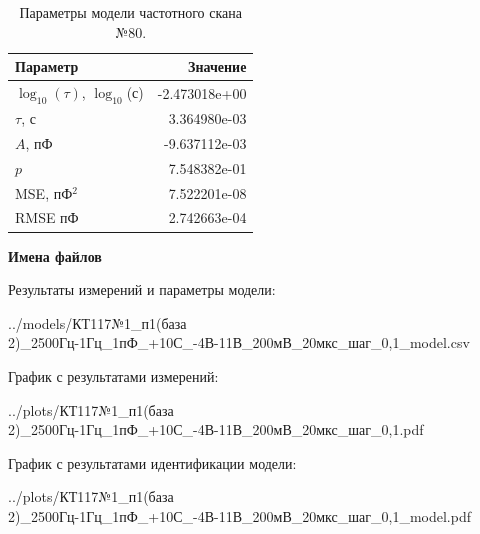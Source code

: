 \begin{table}[!ht]
    \centering
    \caption{Параметры модели частотного скана №80.}
    \begin{tabular}{|l|r|}
        \hline
        Параметр                                       & Значение                  \\ \hline
        $\log_{10}(\tau)$, $\log_{10}$(с)              & -2.473018e+00             \\ \hline
        $\tau$, с                                      & 3.364980e-03              \\ \hline
        $A$, пФ                                        & -9.637112e-03             \\ \hline
        $p$                                            & 7.548382e-01              \\ \hline
        MSE, пФ$^2$                                    & 7.522201e-08              \\ \hline
        RMSE пФ                                        & 2.742663e-04              \\ \hline
    \end{tabular}
    \label{table:frequency_scan_model_80}
\end{table}

\textbf{Имена файлов}

Результаты измерений и параметры модели:

\scriptsize../models/КТ117№1\_п1(база 2)\_2500Гц-1Гц\_1пФ\_+10С\_-4В-11В\_200мВ\_20мкс\_шаг\_0,1\_model.csv
\normalsize

График с результатами измерений:

\scriptsize../plots/КТ117№1\_п1(база 2)\_2500Гц-1Гц\_1пФ\_+10С\_-4В-11В\_200мВ\_20мкс\_шаг\_0,1.pdf
\normalsize

График с результатами идентификации модели:

\scriptsize../plots/КТ117№1\_п1(база 2)\_2500Гц-1Гц\_1пФ\_+10С\_-4В-11В\_200мВ\_20мкс\_шаг\_0,1\_model.pdf
\normalsize

